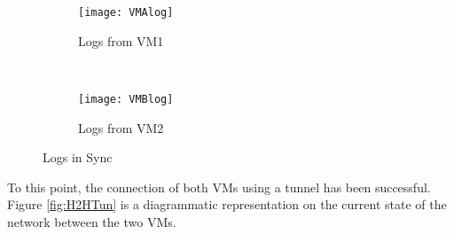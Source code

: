 \documentclass[a4paper,12pt]{article}
\begin{document}
	\begin{figure}[H]
				\centering
				\begin{subfigure}[H]{0.47\textwidth}
					\centering
					\texttt{[image: VMAlog]}
					\caption{Logs from VM1}
					\label{fig:VM1Log}
				\end{subfigure}
				~
				\begin{subfigure}{0.47\textwidth}
					\centering
					\texttt{[image: VMBlog]}
					\caption{Logs from VM2}
					\label{fig:VM2Log}
				\end{subfigure}
				\caption{Logs in Sync}
			\end{figure}
	\noindent To this point, the connection of both VMs using a tunnel has been successful. Figure \ref{fig:H2HTun} is a diagrammatic representation on the current state of the network between the two VMs.
\end{document}
